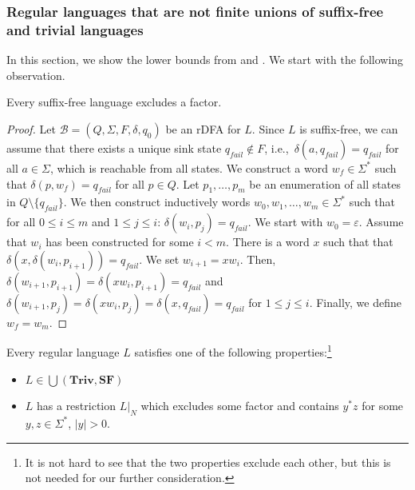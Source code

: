 \documentclass{article}\usepackage[a4paper,margin=20mm]{geometry}
\newcommand{\B}{\mathcal{B}}
\newcommand{\Triv}{\mathbf{Triv}}
\newcommand{\SF}{\mathbf{SF}}
\newcommand{\eps}{\varepsilon}
\renewcommand{\leq}{\leqslant}
\begin{document}
\subsubsection{Regular languages that are not finite unions of suffix-free and trivial languages}
\label{sec-lb-union-nontriv-sf}

In this section, we show the lower bounds from  and .
We start with the following observation.


\begin{lemma}
	\label{lem:sf-ex}
	Every  suffix-free  language excludes a factor.
\end{lemma}

\begin{proof}
Let $\B=(Q,\Sigma,F,\delta,q_0)$ be an rDFA for $L$. Since $L$ is suffix-free,
we can assume that there exists a unique sink state $q_{\mathit{fail}} \notin F$,
i.e.,~$\delta(a, q_{\mathit{fail}}) = q_{\mathit{fail}}$ for all $a \in \Sigma$,
which is reachable from all states.
We construct a word $w_f \in \Sigma^*$ such that $\delta(p, w_f) = q_{\mathit{fail}}$ for all $p \in Q$.
Let $p_1, \ldots, p_m$ be an enumeration of all states in $Q \setminus \{q_{\mathit{fail}}\}$.
We then construct inductively words $w_0,w_1, \ldots, w_m \in \Sigma^*$ such that 
for all $0 \leq i \leq m$ and $1 \leq j \leq i$:  $\delta(w_i, p_j) = q_{\mathit{fail}}$.
We start with $w_0 = \eps$.
Assume that $w_i$ has been constructed for some $i < m$.
There is a word $x$ such that that $\delta( x, \delta(w_i, p_{i+1})) = q_{\mathit{fail}}$. We set $w_{i+1} = xw_i$.
Then, $\delta(w_{i+1}, p_{i+1}) = \delta(xw_i, p_{i+1})= q_{\mathit{fail}}$ and 
$\delta(w_{i+1},p_j) = \delta(xw_i,p_j)= \delta(x,q_{\mathit{fail}}) = q_{\mathit{fail}}$ for $1 \leq j \leq i$.
Finally, we define $w_f = w_m$.
\end{proof}

\begin{lemma}
\label{lem:not-sf}
Every regular language $L$ satisfies one of the following properties:\footnote{It is not hard to see that the two properties exclude each other, but this is not needed for our further
consideration.}
\begin{itemize}
\item $L \in \bigcup(\Triv, \SF)$ 
\item $L$ has a restriction $L|_N$ which excludes some factor
and contains $y^*z$ for some $y,z \in \Sigma^*$, $|y| > 0$.
\end{itemize}
\end{lemma}
\end{document}
